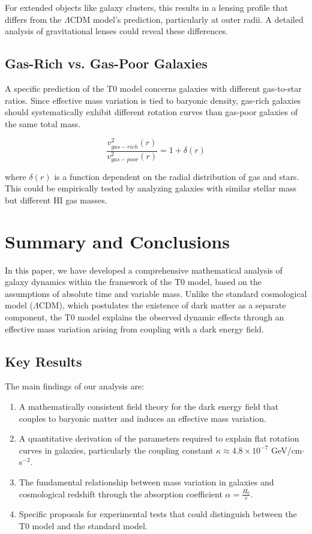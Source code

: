 \documentclass[a4paper,12pt]{article}
\begin{document}
For extended objects like galaxy clusters, this results in a lensing profile that differs from the $\Lambda$CDM model’s prediction, particularly at outer radii. A detailed analysis of gravitational lenses could reveal these differences.

\subsection{Gas-Rich vs. Gas-Poor Galaxies}

A specific prediction of the T0 model concerns galaxies with different gas-to-star ratios. Since effective mass variation is tied to baryonic density, gas-rich galaxies should systematically exhibit different rotation curves than gas-poor galaxies of the same total mass.

\begin{equation}
	\frac{v^2_{gas-rich}(r)}{v^2_{gas-poor}(r)} = 1 + \delta(r)
\end{equation}

where $\delta(r)$ is a function dependent on the radial distribution of gas and stars. This could be empirically tested by analyzing galaxies with similar stellar mass but different HI gas masses.

\section{Summary and Conclusions}

In this paper, we have developed a comprehensive mathematical analysis of galaxy dynamics within the framework of the T0 model, based on the assumptions of absolute time and variable mass. Unlike the standard cosmological model ($\Lambda$CDM), which postulates the existence of dark matter as a separate component, the T0 model explains the observed dynamic effects through an effective mass variation arising from coupling with a dark energy field.

\subsection{Key Results}

The main findings of our analysis are:

\begin{enumerate}
	\item A mathematically consistent field theory for the dark energy field that couples to baryonic matter and induces an effective mass variation.
	
	\item A quantitative derivation of the parameters required to explain flat rotation curves in galaxies, particularly the coupling constant $\kappa \approx 4.8 \times 10^{-7}$ GeV/cm$\cdot$s$^{-2}$.
	
	\item The fundamental relationship between mass variation in galaxies and cosmological redshift through the absorption coefficient $\alpha = \frac{H_0}{c}$.
	
	\item Specific proposals for experimental tests that could distinguish between the T0 model and the standard model.
\end{enumerate}
\end{document}
